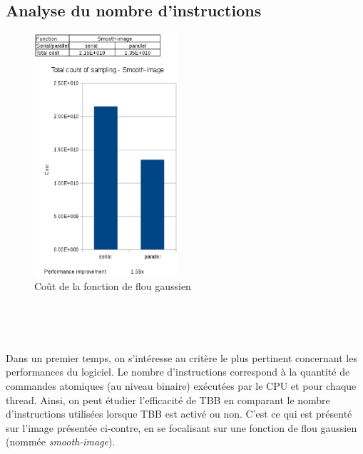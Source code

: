 \documentclass[10pt]{report}
\begin{document}
	

	
	

	
	\subsection{Analyse du nombre d'instructions}
	
	\begin{figure}
		\includegraphics[height=9cm]{Reports/figures/smooth_image_costs.eps}
		\caption{Coût de la fonction de flou gaussien}
		\label{Coût de la fonction de flou gaussien}
	\end{figure}
	~\par~\par
	Dans un premier temps, on s'intéresse au critère le plus pertinent concernant les performances du logiciel. Le nombre d'instructions correspond à la quantité de commandes atomiques (au niveau binaire) exécutées par le CPU et pour chaque thread.
	Ainsi, on peut étudier l'efficacité de TBB en comparant le nombre d'instructions utilisées lorsque TBB est activé ou non. C'est ce qui est présenté sur l'image présentée ci-contre, en se focalisant sur une fonction de flou gaussien (nommée \textit{smooth-image}).\\
\end{document}
